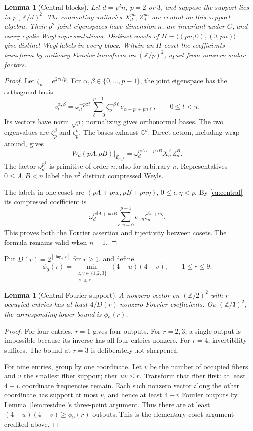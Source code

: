 \documentclass[11pt,a4paper]{article}
\newtheorem{lemma}[theorem]{Lemma}
\theoremstyle{remark}\newtheorem{remark}[theorem]{Remark}
\newcommand{\C}{\mathbb C}\newcommand{\Z}{\mathbb Z}
\newcommand{\fl}[1]{\left\lfloor #1\right\rfloor}
\begin{document}
\begin{lemma}[Central blocks]\label{lem:central}
Let $d=p^2n$, $p=2$ or $3$, and suppose the support lies in $p(\Z/d)^2$.
The commuting unitaries $X_d^{pn},Z_d^{pn}$ are central on this support
algebra. Their $p^2$ joint eigenspaces have dimension $n$, are invariant
under $C$, and carry cyclic Weyl representations. Distinct cosets of
$H=\langle(pn,0),(0,pn)\rangle$ give distinct Weyl labels in every block.
Within an $H$-coset the coefficients transform by ordinary Fourier
transform on $(\Z/p)^2$, apart from nonzero scalar factors.
\end{lemma}
\begin{proof}
Let $\zeta_p=e^{2\pi i/p}$. For $\alpha,\beta\in\{0,\ldots,p-1\}$, the
joint eigenspace has the orthogonal basis
\[
 v_t^{\alpha,\beta}=\omega_d^{-p\beta t}
 \sum_{\ell=0}^{p-1}\zeta_p^{-\beta\ell}
 e_{\alpha+pt+pn\ell},\qquad 0\le t<n .
\]
Its vectors have norm $\sqrt p$; normalizing gives orthonormal bases.
The two eigenvalues are $\zeta_p^\beta$ and $\zeta_p^\alpha$.
The bases exhaust $\C^d$. Direct action, including wrap-around, gives
\begin{equation}\label{eq:central}
 W_d(pA,pB)|_{E_{\alpha,\beta}}
       =\omega_d^{p\beta A+p\alpha B} X_n^AZ_n^B .
\end{equation}
The factor $\omega_d^{p^2}$ is primitive of order $n$, also for arbitrary
$n$. Representatives $0\le A,B<n$ label the $n^2$ distinct compressed Weyls.

The labels in one coset are
$(pA+pn\epsilon,pB+pn\eta)$, $0\le\epsilon,\eta<p$.
By \eqref{eq:central} its compressed coefficient is
\[
 \omega_d^{p\beta A+p\alpha B}
 \sum_{\epsilon,\eta=0}^{p-1}
        c_{\epsilon,\eta}\zeta_p^{\beta\epsilon+\alpha\eta}.
\]
This proves both the Fourier assertion and injectivity between cosets.
The formula remains valid when $n=1$.
\end{proof}

Put $D(r)=2^{\fl{\log_2r}}$ for $r\ge1$, and define
\[
 \phi_9(r)=
 \min_{\substack{u,v\in\{1,2,3\}\\uv\le r}}(4-u)(4-v),
 \qquad 1\le r\le9.
\]
\begin{lemma}[Central Fourier support]\label{lem:fourier}
A nonzero vector on $(\Z/2)^2$ with $r$ occupied entries has at least
$4/D(r)$ nonzero Fourier coefficients. On $(\Z/3)^2$, the corresponding
lower bound is $\phi_9(r)$.
\end{lemma}
\begin{proof}
For four entries, $r=1$ gives four outputs. For $r=2,3$, a single output
is impossible because its inverse has all four entries nonzero. For $r=4$,
invertibility suffices. The bound at $r=3$ is deliberately not sharpened.

For nine entries, group by one coordinate. Let $v$ be the number of
occupied fibers and $u$ the smallest fiber support; then $uv\le r$.
Transform that fiber first: at least $4-u$ coordinate frequencies remain.
Each such nonzero vector along the other coordinate has support at most
$v$, and hence at least $4-v$ Fourier outputs by Lemma~\ref{lem:residue}'s
three-point argument. Thus there are at least $(4-u)(4-v)\ge\phi_9(r)$
outputs. This is the elementary coset argument credited above.
\end{proof}
\end{document}
